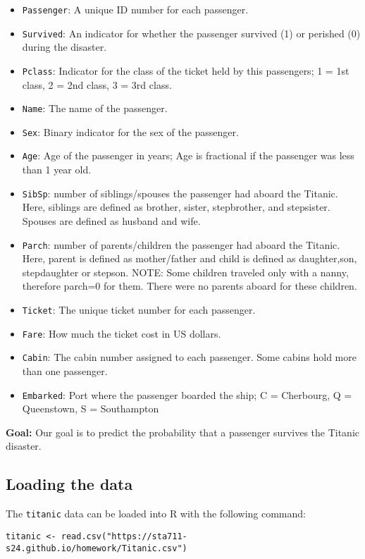 \documentclass[11pt]{article}
\begin{document}
\begin{itemize}
\item \verb;Passenger;: A unique ID number for each passenger.
\item \verb;Survived;: An indicator for whether the passenger survived (1) or perished (0) during the disaster.
\item \verb;Pclass;: Indicator for the class of the ticket held by this passengers; 1 = 1st class, 2 = 2nd class, 3 = 3rd class.
\item \verb;Name;: The name of the passenger.
\item \verb;Sex;: Binary indicator for the sex of the passenger.
\item \verb;Age;: Age of the passenger in years; Age is fractional if the passenger was less than 1 year old.
\item \verb;SibSp;: number of siblings/spouses the passenger had aboard the Titanic. Here, siblings are defined as brother, sister, stepbrother, and stepsister. Spouses are defined as husband and wife.
\item \verb;Parch;: number of parents/children the passenger had aboard the Titanic. Here, parent is defined as mother/father and child is defined as daughter,son, stepdaughter or stepson. NOTE: Some children traveled only with a nanny, therefore parch=0 for them. There were no parents aboard for these children.
\item \verb;Ticket;: The unique ticket number for each passenger.
\item \verb;Fare;: How much the ticket cost in US dollars.
\item \verb;Cabin;: The cabin number assigned to each passenger. Some cabins hold more than one passenger.
\item \verb;Embarked;: Port where the passenger boarded the ship; C = Cherbourg, Q = Queenstown, S = Southampton
\end{itemize}

\noindent \textbf{Goal:} Our goal is to predict the probability that a passenger survives the Titanic disaster.

\subsection*{Loading the data}

The \verb;titanic; data can be loaded into R with the following command:

\begin{verbatim}
titanic <- read.csv("https://sta711-s24.github.io/homework/Titanic.csv")
\end{verbatim}
\end{document}
